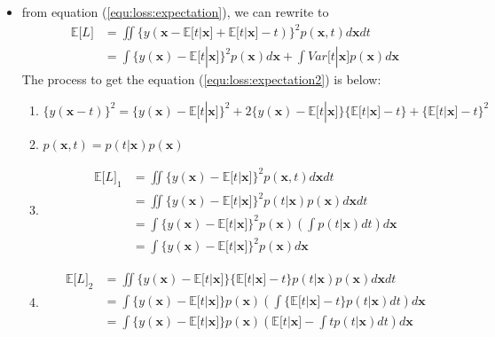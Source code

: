 \documentclass[UTF8]{article}
\begin{document}
\begin{itemize}
        \item from equation (\ref{equ:loss:expectation}), we can rewrite to
        \begin{align}
            \mathbb{E}\lbrack L\rbrack&=\iint\{y(\bm{x}-\mathbb{E}\lbrack t|\bm{x}\rbrack
            +\mathbb{E}\lbrack t|\bm{x}\rbrack-t)\}^2p(\bm{x},t)d\bm{x}dt\nonumber\\
            \label{equ:loss:expectation2}
            &=\int\{y(\bm{x})-\mathbb{E}\lbrack t|\bm{x}\rbrack\}^2p(\bm{x})d\bm{x}+
            \int Var\lbrack t|\bm{x}\rbrack p(\bm{x})d\bm{x}
        \end{align}
        The process to get the equation (\ref{equ:loss:expectation2}) is below:
        \begin{enumerate}
            \item $\{y(\bm{x}-t)\}^2=\{y(\bm{x})-\mathbb{E}\lbrack t|\bm{x}\rbrack\}^2
            +2\{y(\bm{x})-\mathbb{E}\lbrack t|\bm{x}\rbrack\}\{\mathbb{E}\lbrack t|\bm{x}
            \rbrack-t\}+\{\mathbb{E}\lbrack t|\bm{x}\rbrack-t\}^2$
            \item $p(\bm{x},t)=p(t|\bm{x})p(\bm{x})$
            \item \begin{align*}
            \mathbb{E}\lbrack L\rbrack_1&=\iint\{y(\bm{x})-\mathbb{E}\lbrack t|\bm{x}
            \rbrack\}^2p(\bm{x},t)d\bm{x}dt\\
            &=\iint\{y(\bm{x})-\mathbb{E}\lbrack t|\bm{x}\rbrack\}^2p(t|\bm{x})p(\bm{x})d\bm{x}dt\\
            &=\int\{y(\bm{x})-\mathbb{E}\lbrack t|\bm{x}\rbrack\}^2p(\bm{x})
            (\int p(t|\bm{x})dt)d\bm{x}\\
            &=\int\{y(\bm{x})-\mathbb{E}\lbrack t|\bm{x}\rbrack\}^2p(\bm{x})d\bm{x}
            \end{align*}
            \item \begin{align*}
                \mathbb{E}\lbrack L\rbrack_2&=\iint\{y(\bm{x})-\mathbb{E}\lbrack t|\bm{x}\rbrack\}
                \{\mathbb{E}\lbrack t|\bm{x}\rbrack-t\}p(t|\bm{x})p(\bm{x})d\bm{x}dt\\
                &=\int\{y(\bm{x})-\mathbb{E}\lbrack t|\bm{x}\rbrack\}p(\bm{x})
                (\int\{\mathbb{E}\lbrack t|\bm{x}\rbrack-t\}p(t|\bm{x})dt)d\bm{x}\\
                &=\int\{y(\bm{x})-\mathbb{E}\lbrack t|\bm{x}\rbrack\}p(\bm{x})
                (\mathbb{E}\lbrack t|\bm{x}\rbrack-\int tp(t|\bm{x})dt)d\bm{x}\\

\end{align*}
\end{enumerate}
\end{itemize}
\end{document}

